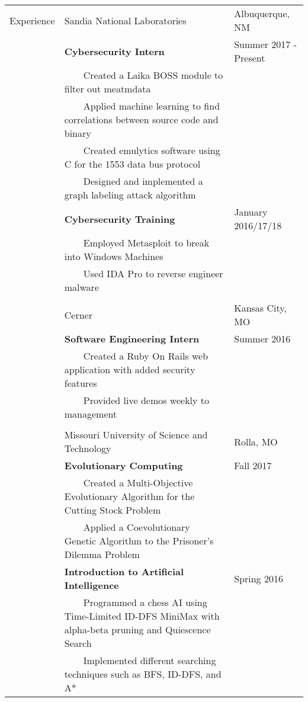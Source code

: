 \documentclass[10.5pt, arial]{article}
\newcommand{\tabitem}{~~\llap{\textbullet}~~}
\begin{document}
\begin{tabular}{p{1.5cm} p{13.2cm} l}
Experience  & Sandia National Laboratories	& Albuquerque, NM 		\\
			& \textbf{Cybersecurity Intern}										& Summer 2017 - Present 		\\
			& \tabitem Created a Laika BOSS module to filter out meatmdata		&						\\
			& \tabitem Applied machine learning to find correlations between source code and binary & 	\\
			& \tabitem Created emulytics software using C for the 1553 data bus protocol 	&			\\
            & \tabitem Designed and implemented a graph labeling attack algorithm &     \\
            & \textbf{Cybersecurity Training} 									& January 2016/17/18 			\\
			& \tabitem Employed Metasploit to break into Windows Machines			& 						\\
			& \tabitem Used IDA Pro to reverse engineer malware 				& 						\\ \\

			& Cerner 															& Kansas City, MO 		\\
			& \textbf{Software Engineering Intern} 								& Summer 2016			\\
			& \tabitem Created a Ruby On Rails web application with added security features					& 						\\
			& \tabitem Provided live demos weekly to management 				& 						\\ \\

			& Missouri University of Science and Technology						& Rolla, MO 			\\
			& \textbf{Evolutionary Computing} 									& Fall 2017 			\\
			& \tabitem Created a Multi-Objective Evolutionary Algorithm for the Cutting Stock Problem	& \\
			& \tabitem Applied a Coevolutionary Genetic Algorithm to the Prisoner's Dilemma Problem 	& 		\\

			& \textbf{Introduction to Artificial Intelligence} 					& Spring 2016 			\\
			& \tabitem Programmed a chess AI using Time-Limited ID-DFS MiniMax with alpha-beta pruning and Quiescence Search	& \\
			& \tabitem Implemented different searching techniques such as BFS, ID-DFS, and A* 	& 		\\


\end{tabular}
\end{document}
